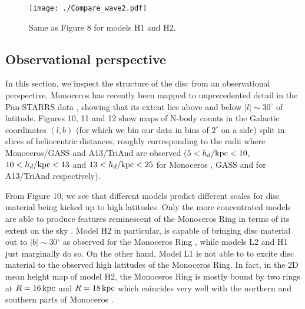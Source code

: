 \documentclass[useAMS,usenatbib]{mnras}
\begin{document}
\begin{figure}
\texttt{[image: ./Compare\_wave2.pdf]}
\caption[]{Same as Figure 8 for models H1 and H2.}
\end{figure}



\subsection{Observational perspective}

In this section, we inspect the structure of the disc from an observational perspective. Monoceros has recently been mapped to unprecedented detail in the Pan-STARRS data \citep{slater14,morganson16}, showing that its extent lies above and below $|l|\sim30^{\circ}$ of latitude. Figures 10, 11 and 12 show maps of N-body counts in the Galactic coordinates $(l,b)$ (for which we bin our data in bins of $2^{\circ}$ on a side) split in slices of heliocentric distances, roughly corresponding to the radii where Monoceros/GASS and A13/TriAnd are observed ($5<h_{d}/\rm{kpc}<10$, $10<h_{d}/\rm{kpc}<13$ and $13<h_{d}/\rm{kpc}<25$  for Monoceros \citep{morganson16}, GASS \citep{crane03} and for A13/TriAnd \citep{li17,sheffield14} respectively).  

From Figure 10, we see that different models predict different scales for disc material being kicked up to high latitudes. Only the more concentrated models are able to produce features reminescent of the Monoceros Ring in terms of its extent on the sky \citep{slater14}. Model H2 in particular, is capable of bringing disc material out to $|b|\sim30^{\circ}$ as observed for the Monoceros Ring \citep{slater14}, while models L2 and H1 just marginally do so. On the other hand, Model L1 is not able to to excite disc material to the observed high latitudes of the Monoceros Ring. In fact, in the 2D mean height map of model H2, the Monoceros Ring is mostly bound by two rings at $R=16\,\rm{kpc}$ and $R=18\,\rm{kpc}$ which coincides very well with the northern and southern parts of Monoceros \citep{morganson16}.
\end{document}
